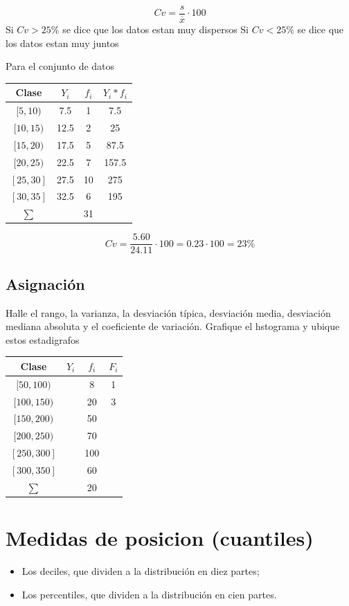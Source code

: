 \documentclass[10pt,]{krantz}
\providecommand{\tightlist}{%
  \setlength{\itemsep}{0pt}\setlength{\parskip}{0pt}}
\theoremstyle{definition}
\theoremstyle{definition}
\theoremstyle{definition}
\theoremstyle{definition}
\theoremstyle{remark}
\begin{document}
\[Cv=\frac{s}{\overline{x}}\cdot 100\] Si \(Cv>25\%\) se dice que los datos estan muy dispersos Si \(Cv<25\%\) se dice que los datos estan muy juntos

Para el conjunto de datos

\begin{longtable}[]{@{}cccc@{}}
\toprule
Clase & \(Y_i\) & \(f_i\) & \(Y_i*f_i\)\tabularnewline
\midrule
\endhead
\([5,10)\) & 7.5 & 1 & 7.5\tabularnewline
\([10,15)\) & 12.5 & 2 & 25\tabularnewline
\([15,20)\) & 17.5 & 5 & 87.5\tabularnewline
\([20,25)\) & 22.5 & 7 & 157.5\tabularnewline
\([25,30]\) & 27.5 & 10 & 275\tabularnewline
\([30,35]\) & 32.5 & 6 & 195\tabularnewline
\(\sum\) & & 31 &\tabularnewline
\bottomrule
\end{longtable}

\[Cv=\frac{5.60}{24.11}\cdot 100=0.23\cdot 100=23\%\]

\hypertarget{asignaciuxf3n-1}{%
\section{Asignación}\label{asignaciuxf3n-1}}

Halle el rango, la varianza, la desviación típica, desviación media, desviación mediana absoluta y el coeficiente de variación. Grafique el hstograma y ubique estos estadigrafos

\begin{longtable}[]{@{}cccc@{}}
\toprule
Clase & \(Y_i\) & \(f_i\) & \(F_i\)\tabularnewline
\midrule
\endhead
\([50,100)\) & & 8 & 1\tabularnewline
\([100,150)\) & & 20 & 3\tabularnewline
\([150,200)\) & & 50 &\tabularnewline
\([200,250)\) & & 70 &\tabularnewline
\([250,300]\) & & 100 &\tabularnewline
\([300,350]\) & & 60 &\tabularnewline
\(\sum\) & & 20 &\tabularnewline
\bottomrule
\end{longtable}

\hypertarget{medidas-de-posicion-cuantiles}{%
\chapter{Medidas de posicion (cuantiles)}\label{medidas-de-posicion-cuantiles}}

\begin{itemize}
\tightlist
\item
  Los deciles, que dividen a la distribución en diez partes;
\item
  Los percentiles, que dividen a la distribución en cien partes.
\end{itemize}
\end{document}
